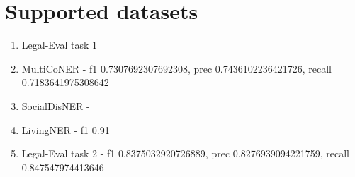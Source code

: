 \documentclass{article}
\begin{document}
\section{Supported datasets}
\begin{enumerate}
  \item Legal-Eval task 1
  \item MultiCoNER - f1 0.7307692307692308, prec 0.7436102236421726, recall 0.7183641975308642
  \item SocialDisNER - 
  \item LivingNER - f1 0.91
  \item Legal-Eval task 2 - f1 0.8375032920726889, prec 0.8276939094221759, recall 0.847547974413646
\end{enumerate}
\end{document}
